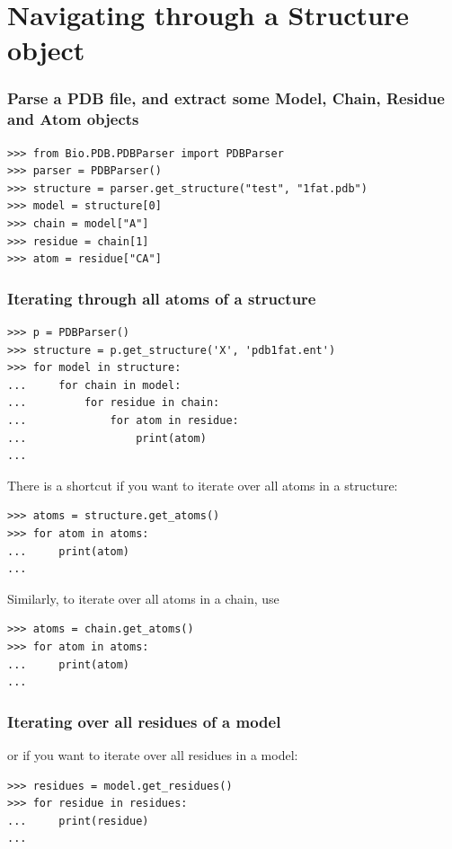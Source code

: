 \documentclass{report}
\begin{document}
\section{Navigating through a Structure object}

\subsubsection*{Parse a PDB file, and extract some Model, Chain, Residue and Atom objects}

\begin{verbatim}
>>> from Bio.PDB.PDBParser import PDBParser
>>> parser = PDBParser()
>>> structure = parser.get_structure("test", "1fat.pdb")
>>> model = structure[0]
>>> chain = model["A"]
>>> residue = chain[1]
>>> atom = residue["CA"]
\end{verbatim}

\subsubsection*{Iterating through all atoms of a structure}

\begin{verbatim}
>>> p = PDBParser()
>>> structure = p.get_structure('X', 'pdb1fat.ent')
>>> for model in structure:
...     for chain in model:
...         for residue in chain:
...             for atom in residue:
...                 print(atom)
...
\end{verbatim}

There is a shortcut if you want to iterate over all atoms in a structure:
\begin{verbatim}
>>> atoms = structure.get_atoms()
>>> for atom in atoms:
...     print(atom)
...
\end{verbatim}

Similarly, to iterate over all atoms in a chain, use
\begin{verbatim}
>>> atoms = chain.get_atoms()
>>> for atom in atoms:
...     print(atom)
...
\end{verbatim}

\subsubsection*{Iterating over all residues of a model}

or if you want to iterate over all residues in a model:
\begin{verbatim}
>>> residues = model.get_residues()
>>> for residue in residues:
...     print(residue)
...
\end{verbatim}
\end{document}
